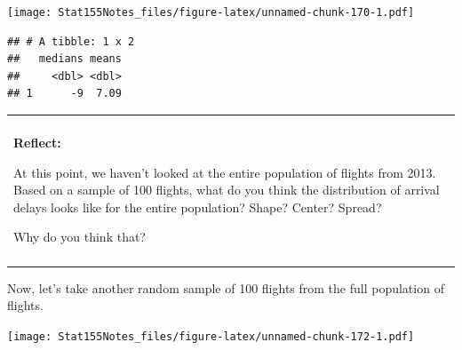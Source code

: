 \documentclass[]{book}
\newenvironment{Shaded}{\begin{snugshade}}{\end{snugshade}}
\newcommand{\CommentTok}[1]{\textcolor[rgb]{0.56,0.35,0.01}{\textit{#1}}}
\newcommand{\DataTypeTok}[1]{\textcolor[rgb]{0.13,0.29,0.53}{#1}}
\newcommand{\DecValTok}[1]{\textcolor[rgb]{0.00,0.00,0.81}{#1}}
\newcommand{\KeywordTok}[1]{\textcolor[rgb]{0.13,0.29,0.53}{\textbf{#1}}}
\newcommand{\NormalTok}[1]{#1}
\newcommand{\OperatorTok}[1]{\textcolor[rgb]{0.81,0.36,0.00}{\textbf{#1}}}
\newcommand{\StringTok}[1]{\textcolor[rgb]{0.31,0.60,0.02}{#1}}
\newenvironment{reflect}
{
    \begin{center}
    
    \begin{tabular}{|p{0.8\textwidth}|}
    \rowcolor{LightBlue}
    \hline\\
    \rowcolor{LightBlue}
    \textbf{Reflect:}
}
{
    \\\rowcolor{LightBlue}
    \\\hline
    \end{tabular} 
    \end{center}
}
\begin{document}
\texttt{[image: Stat155Notes\_files/figure-latex/unnamed-chunk-170-1.pdf]}

\begin{Shaded}
\end{Shaded}

\begin{verbatim}
## # A tibble: 1 x 2
##   medians means
##     <dbl> <dbl>
## 1      -9  7.09
\end{verbatim}

\begin{reflect}
At this point, we haven't looked at the entire population of flights
from 2013. Based on a sample of 100 flights, what do you think the
distribution of arrival delays looks like for the entire population?
Shape? Center? Spread?

Why do you think that?
\end{reflect}

Now, let's take another random sample of 100 flights from the full population of flights.

\begin{Shaded}
\end{Shaded}

\texttt{[image: Stat155Notes\_files/figure-latex/unnamed-chunk-172-1.pdf]}

\begin{Shaded}
\end{Shaded}
\end{document}
